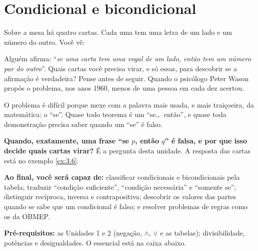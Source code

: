 \providecommand{\nao}{{\sim}}
\clearpage
\section{Condicional e bicondicional}

\Prefacio
\begin{prefacio}

Sobre a mesa há quatro cartas. Cada uma tem uma letra de um lado e um número do outro. Você vê:
\begin{center}
\qquad {}\qquad {}\qquad {}
\end{center}
Alguém afirma: \enquote{\emph{se uma carta tem uma vogal de um lado, então tem um número par do outro}}. Quais cartas você precisa virar, e só essas, para descobrir se a afirmação é verdadeira? Pense antes de seguir. Quando o psicólogo Peter Wason propôs o problema, nos anos 1960, menos de uma pessoa em cada dez acertou.

O problema é difícil porque mexe com a palavra mais usada, e mais traiçoeira, da matemática: o \enquote{se}. Quase todo teorema é um \enquote{se\ldots\ então}, e quase toda demonstração precisa saber quando um \enquote{se} é falso.

\textbf{Quando, exatamente, uma frase \enquote{se $p$, então $q$} é falsa, e por que isso decide quais cartas virar?} É a pergunta desta unidade. A resposta das cartas está no exemplo \ref{ex:3.6}.

\textbf{Ao final, você será capaz de:} classificar condicionais e bicondicionais pela tabela; traduzir \enquote{condição suficiente}, \enquote{condição necessária} e \enquote{somente se}; distinguir recíproca, inversa e contrapositiva; descobrir os valores das partes quando se sabe que um condicional é falso; e resolver problemas de regras como os da OBMEP.

\textbf{Pré-requisitos:} as Unidades 1 e 2 (negação, $\wedge$, $\vee$ e as tabelas); divisibilidade, potências e desigualdades. O essencial está na caixa abaixo.
\end{prefacio}

